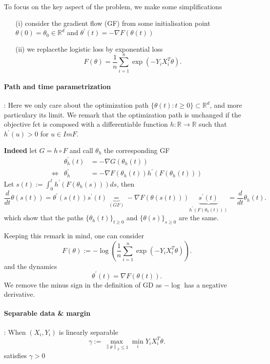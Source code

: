 To focus on the key aspect of the problem, we make some simplifications \begin{enumerate}
    \item [(i)] consider the gradient flow (GF) from some initialisation point $ \theta (0) = \theta _0 \in \mathbb{R}^d $ and $ \theta ^\prime (t) = - \nabla F(\theta (t)) $ 
    \item [(ii)] we replacethe logistic loss by exponential loss 
    \[
        F(\theta ) = \frac{1 }{n } \sum_{i=1}^{n } \exp (-Y_i X_i^T \theta )
    .\]
\end{enumerate}
\paragraph{Path and time parametrization}: Here we only care about the optimization path $ \{\theta (t) : t \geq 0\} \subset \mathbb{R}^d $, and more particulary its limit. We remark that the optimization path is unchanged if the objective fct is composed with a differentiable function $ h: \mathbb{R} \to \mathbb{R} $ such that $ h^\prime (u) > 0  $ for $ u \in Im F $.

\textbf{Indeed} let $ G = h \circ F $ and call $ \theta _h $ the corresponding GF 
\begin{align*}
    & \theta ^\prime _h (t) &= - \nabla G(\theta _h (t))\\
    \Leftrightarrow & \theta ^\prime _h &= - \nabla F(\theta _h (t)) h^\prime (F(\theta _h (t))) 
\end{align*}
Let $ s(t) := \int_{0}^{t} h^\prime (F(\theta _h (s)))ds $, then 
\[
    \frac{d}{dt}\theta (s(t)) = \theta ^\prime (s(t)) s^\prime (t) \underbrace{=}_{(GF)} - \nabla F(\theta (s(t))) \underbrace{s^\prime (t)}_{h^\prime (F (\theta _h (t)))} = \frac{d}{dt}  \theta _h(t) 
.\]
which show that the paths $ \{\theta _h (t) \}_{t \geq 0} $ and $ \{\theta (s)\}_{s \geq 0} $  are the same.

Keeping this remark in mind, one can consider 
\[
    F(\theta ) := - \log (\frac{1 }{n } \sum_{i=1 }^{n } \exp (-Y_i X_i^T \theta )) 
.\]
and the dynamics 
\[
    \theta ^\prime (t) = \nabla F(\theta (t))
.\]
We remove the minus sign in the definition of GD as $ -\log $ has a negative derivative.

\paragraph{Separable data \& margin}: When $ (X_i, Y_i) $ is linearly separable 
\[
    \gamma := \max _{\left\| \theta  \right\| _2 \leq 1} \min _i Y_i X_i ^T \theta 
.\]
satisfies $ \gamma > 0 $ 

